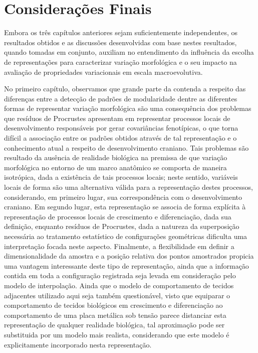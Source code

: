 \documentclass[12pt,twoside]{report}
\begin{document}

\newpage
\chapter{Considerações Finais}
\label{ch:fin}

Embora os três capítulos anteriores sejam suficientemente independentes,
os resultados obtidos e as discussões desenvolvidas com base nestes
resultados, quando tomadas em conjunto, auxiliam no entendimento da
influência da escolha de representações para caracterizar variação
morfológica e o seu impacto na avaliação de propriedades variacionais em
escala macroevolutiva.

No primeiro capítulo, observamos que grande parte da contenda a respeito
das diferenças entre a detecção de padrões de modularidade dentre as
diferentes formas de representar variação morfológica são uma
consequência dos problemas que resíduos de Procrustes apresentam em
representar processos locais de desenvolvimento responsáveis por gerar
covariâncias fenotípicas, o que torna difícil a associação entre os
padrões obtidos através de tal representação e o conhecimento atual a
respeito de desenvolvimento craniano. Tais problemas são resultado da
ausência de realidade biológica na premissa de que variação morfológica
no entorno de um marco anatômico se comporta de maneira isotrópica, dada
a existência de tais processos locais; neste sentido, variáveis locais
de forma são uma alternativa válida para a representação destes
processos, considerando, em primeiro lugar, sua correspondência com o
desenvolvimento craniano. Em segundo lugar, esta representação se
associa de forma explícita à representação de processos locais de
crescimento e diferenciação, dada sua definição, enquanto resíduos de
Procrustes, dada a natureza da superposição necessária ao tratamento
estatístico de configurações geométricas dificulta uma interpretação
focada neste aspecto. Finalmente, a flexibilidade em definir a
dimensionalidade da amostra e a posição relativa dos pontos amostrados
propicia uma vantagem interessante deste tipo de representação, ainda
que a informação contida em toda a configuração registrada seja levada
em consideração pelo modelo de interpolação. Ainda que o modelo de
comportamento de tecidos adjacentes utilizado aqui seja também
questionável, visto que equiparar o comportamento de tecidos biológicos
em crescimento e diferenciação ao comportamento de uma placa metálica
sob tensão parece distanciar esta representação de qualquer realidade
biológica, tal aproximação pode ser substituida por um modelo mais
realista, considerando que este modelo é explicitamente incorporado
nesta representação.
\end{document}
